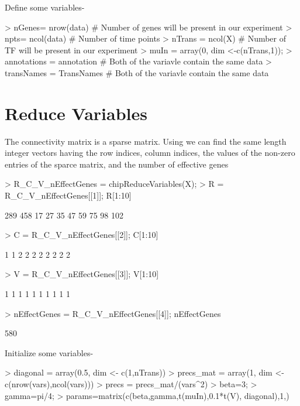 \documentclass{article}
\begin{document}
Define some variables-
\begin{Schunk}
\begin{Sinput}
> nGenes= nrow(data) # Number of genes will be present in our experiment
> npts= ncol(data) # Number of time points
> nTrans = ncol(X) # Number of TF will be present in our experiment
> muIn = array(0, dim <-c(nTrans,1)); 
> annotations = annotation # Both of the variavle contain the same data
> transNames = TransNames # Both of the variavle contain the same data
\end{Sinput}
\end{Schunk}

\section{Reduce Variables}
The connectivity matrix is a sparse matrix. Using  we can find the same length integer vectors having the row indices, column indices, the values of the non-zero entries of the sparce matrix, and the number of effective genes
\begin{Schunk}
\begin{Sinput}
> R_C_V_nEffectGenes = chipReduceVariables(X);
> R = R_C_V_nEffectGenes[[1]]; R[1:10]
\end{Sinput}
\begin{Soutput}
 [1] 289 458  17  27  35  47  59  75  98 102
\end{Soutput}
\begin{Sinput}
> C = R_C_V_nEffectGenes[[2]]; C[1:10]
\end{Sinput}
\begin{Soutput}
 [1] 1 1 2 2 2 2 2 2 2 2
\end{Soutput}
\begin{Sinput}
> V = R_C_V_nEffectGenes[[3]]; V[1:10]
\end{Sinput}
\begin{Soutput}
 [1] 1 1 1 1 1 1 1 1 1 1
\end{Soutput}
\begin{Sinput}
> nEffectGenes = R_C_V_nEffectGenes[[4]]; nEffectGenes
\end{Sinput}
\begin{Soutput}
[1] 580
\end{Soutput}
\end{Schunk}

Initialize some variables-
\begin{Schunk}
\begin{Sinput}
> diagonal = array(0.5, dim <- c(1,nTrans))
> precs_mat = array(1, dim <- c(nrow(vars),ncol(vars)))
> precs = precs_mat/(vars^2)
> beta=3;
> gamma=pi/4;
> params=matrix(c(beta,gamma,t(muIn),0.1*t(V), diagonal),1,)
\end{Sinput}
\end{Schunk}
\end{document}
